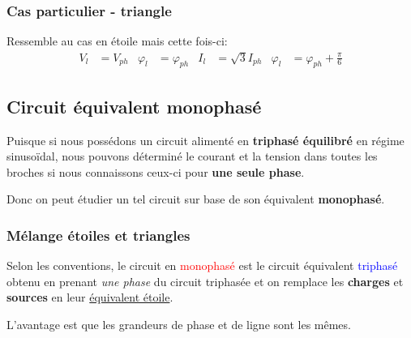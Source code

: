 \documentclass{report}
\begin{document}
\subsubsection{Cas particulier - triangle}
Ressemble au cas en étoile mais cette fois-ci:
\begin{align*}
V_l &= V_{ph} & \varphi_l &= \varphi_{ph}& I_l &= \sqrt{3} I_{ph} & \varphi_l &= \varphi_{ph} + \frac{\pi}{6}
\end{align*}


\subsection{Circuit équivalent monophasé}
Puisque si nous possédons un circuit alimenté en \textbf{triphasé équilibré} en régime sinusoïdal, nous pouvons déterminé le courant et la tension dans toutes les broches si nous connaissons ceux-ci pour \textbf{une seule phase}.\par
Donc on peut étudier un tel circuit sur base de son équivalent \textbf{monophasé}.

\subsubsection{Mélange étoiles et triangles}
Selon les conventions, le circuit en \textcolor{red}{monophasé} est le circuit équivalent \textcolor{blue}{triphasé} obtenu en prenant \textit{une phase} du circuit triphasée et on remplace les \textbf{charges} et \textbf{sources} en leur \underline{équivalent étoile}.\par
L'avantage est que les grandeurs de phase et de ligne sont les mêmes.
\end{document}

